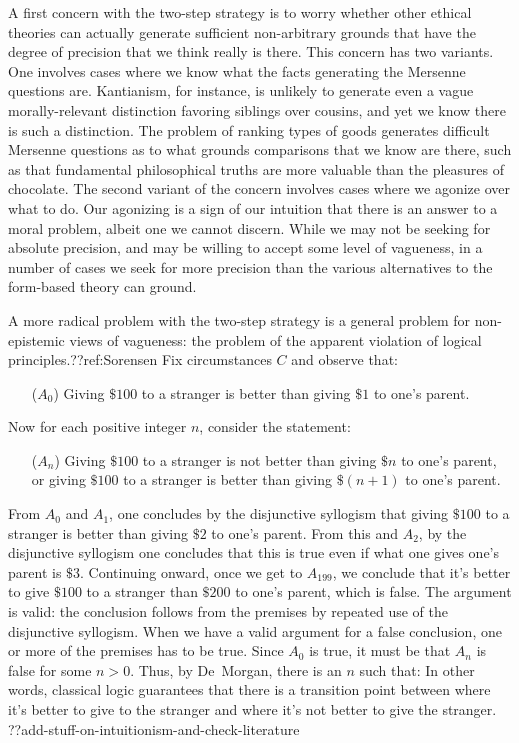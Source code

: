 A first concern with the two-step strategy is to worry whether other ethical theories can actually generate sufficient non-arbitrary grounds
that have the degree of precision that we think really is there. 
This concern has two variants. One involves cases where we know what the facts generating the Mersenne questions are.
Kantianism, for instance, is unlikely to generate even a vague morally-relevant 
distinction favoring siblings over cousins, and yet we know there is such a distinction. The problem of ranking types of goods generates difficult 
Mersenne questions as to what grounds comparisons that we know are there, such as that fundamental philosophical truths are more valuable than the 
pleasures of chocolate. The second variant of the concern involves cases where we agonize over what to do. Our agonizing is a sign of our intuition
that there is an answer to a moral problem, albeit one we cannot discern. While we may not be seeking for absolute precision, and may be willing
to accept some level of vagueness, in a number of cases we seek for more precision than the various alternatives to the form-based theory can ground. 

A more radical problem with the two-step strategy is a general problem for non-epistemic views of vagueness: the problem of the apparent violation
of logical principles.??ref:Sorensen Fix circumstances $C$ and observe that:
\begin{itemize}
\item[($A_0$)] Giving $ \$100$ to a stranger is better than giving $ \$1$ to one's parent.
\end{itemize}

Now for each positive integer $n$, consider the statement:
\begin{itemize}
\item[($A_n$)] Giving $ \$100$ to a stranger is not better than giving $ \$n$ to one's parent, or giving  $ \$100$ to a stranger is better than giving
    $ \$(n+1)$ to one's parent.
\end{itemize}

From $A_0$ and $A_1$, one concludes by the disjunctive syllogism that giving $ \$100$ to a stranger is better than giving $ \$2$ to one's parent.
From this and $A_2$, by the disjunctive syllogism one concludes that this is true even if what one gives one's parent is $ \$3$. Continuing onward,
once we get to $A_{199}$, we conclude that it's better to give $ \$100$ to a stranger than $ \$200$ to one's parent, which is false. The argument
is valid: the conclusion follows from the premises by repeated use of the disjunctive syllogism. When we have a valid argument for a false 
conclusion, one or more of the premises has to be true. Since $A_0$ is true, it must be that $A_n$ is false for some $n>0$. Thus, by De~Morgan,
there is an $n$ such that:
In other words, classical logic guarantees that there is a transition point between where it's better to give to the stranger and where it's not better to give the stranger.
??add-stuff-on-intuitionism-and-check-literature

